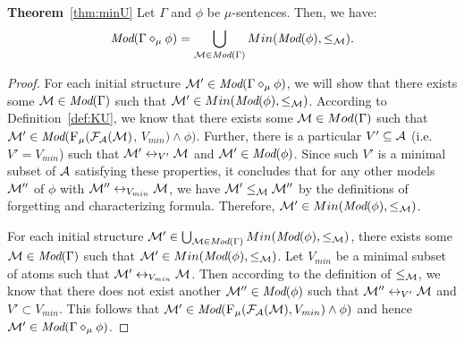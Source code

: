 \documentclass[runningheads]{llncs}
\begin{document}
\noindent\textbf{Theorem}~\ref{thm:minU}
Let $\Gamma$ and $\phi$ be $\mu$-sentences. Then, we have:
\[\textit{Mod}(\Gamma \diamond_{\mu} \phi) = \bigcup_{{\cal M}\in \textit{Mod}(\Gamma)} Min(\textit{Mod}(\phi), \leq_{{\cal M}}).
\]
\begin{proof}
For each initial structure ${\cal M}'\in \textit{Mod}(\Gamma \diamond_{\mu} \phi)$, we will show that there exists some ${\cal M} \in \textit{Mod}(\Gamma)$ such that ${\cal M}' \in  Min(\textit{Mod}(\phi), \leq_{{\cal M}})$. According to Definition~\ref{def:KU}, we know that there exists some ${\cal M}\in Mod(\Gamma)$  such that ${\cal M}'\in \textit{Mod}({\textsc{F}_{\textsc{$\mu$}}}({\cal F}_{{\cal A}}({\cal M})$, $V_{min}) \wedge \phi)$. Further, there is a particular $V'\subseteq {\cal A}$ (i.e. $V' = V_{min}$) such that ${\cal M}' \leftrightarrow_{V'} {\cal M}$ and ${\cal M}' \in \textit{Mod}(\phi)$. Since such $V'$ is a minimal subset of ${\cal A}$ satisfying these properties, it concludes that for any other models ${\cal M}''$ of $\phi$ with ${\cal M}'' \leftrightarrow_{V_{min}} {\cal M}$, we have ${\cal M}' \leq_{{\cal M}} {\cal M}''$ by the definitions of forgetting and characterizing  formula. Therefore, ${\cal M}' \in Min(\textit{Mod}(\phi), \leq_{{\cal M}})$.

For each initial structure ${\cal M}'\in \bigcup_{{\cal M}\in \textit{Mod}(\Gamma)} Min(\textit{Mod}(\phi), \leq_{{\cal M}})$, there exists some ${\cal M} \in \textit{Mod}(\Gamma)$ such that ${\cal M}' \in  Min(\textit{Mod}(\phi), \leq_{{\cal M}})$. Let $V_{min}$ be a minimal subset of atoms such that ${\cal M}' \leftrightarrow_{V_{min}} {\cal M}$. Then according to the definition of $\leq_{{\cal M}}$, we know that there does not exist another ${\cal M}''\in \textit{Mod}(\phi)$ such that ${\cal M}'' \leftrightarrow_{V'} {\cal M}$ and $V' \subset V_{min}$. This follows that ${\cal M}' \in \textit{Mod}({\textsc{F}_{\textsc{$\mu$}}}({\cal F}_{{\cal A}}({\cal M}), V_{min}) \wedge \phi)$ and hence ${\cal M}' \in \textit{Mod}(\Gamma \diamond_{\mu} \phi)$.
\end{proof}
\end{document}
